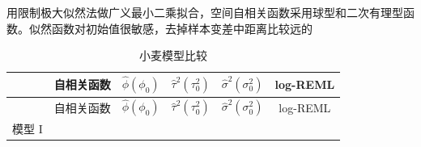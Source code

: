 \documentclass[12pt,a4paper,UTF8,twoside]{book}
\theoremstyle{definition}
\theoremstyle{definition}
\theoremstyle{definition}
\theoremstyle{remark}
\begin{document}
用限制极大似然法做广义最小二乘拟合，空间自相关函数采用球型和二次有理型函数。似然函数对初始值很敏感，去掉样本变差中距离比较远的

\begin{longtable}[]{@{}lrrrrc@{}}
\caption{\label{tab:yields-model-compare} 小麦模型比较}\tabularnewline
\toprule
\begin{minipage}[b]{0.08\columnwidth}\raggedright
\strut
\end{minipage} & \begin{minipage}[b]{0.08\columnwidth}\raggedleft
自相关函数\strut
\end{minipage} & \begin{minipage}[b]{0.18\columnwidth}\raggedleft
\(\hat{\phi}(\phi_0)\)\strut
\end{minipage} & \begin{minipage}[b]{0.20\columnwidth}\raggedleft
\(\hat{\tau}^2(\tau^2_{0})\)\strut
\end{minipage} & \begin{minipage}[b]{0.19\columnwidth}\raggedleft
\(\hat{\sigma}^2(\sigma^2_{0})\)\strut
\end{minipage} & \begin{minipage}[b]{0.09\columnwidth}\centering
log-REML\strut
\end{minipage}\tabularnewline
\midrule
\endfirsthead
\toprule
\begin{minipage}[b]{0.08\columnwidth}\raggedright
\strut
\end{minipage} & \begin{minipage}[b]{0.08\columnwidth}\raggedleft
自相关函数\strut
\end{minipage} & \begin{minipage}[b]{0.18\columnwidth}\raggedleft
\(\hat{\phi}(\phi_0)\)\strut
\end{minipage} & \begin{minipage}[b]{0.20\columnwidth}\raggedleft
\(\hat{\tau}^2(\tau^2_{0})\)\strut
\end{minipage} & \begin{minipage}[b]{0.19\columnwidth}\raggedleft
\(\hat{\sigma}^2(\sigma^2_{0})\)\strut
\end{minipage} & \begin{minipage}[b]{0.09\columnwidth}\centering
log-REML\strut
\end{minipage}\tabularnewline
\midrule
\endhead
\begin{minipage}[t]{0.08\columnwidth}\raggedright
模型 I\strut
\end{minipage} & \begin{minipage}[t]{0.08\columnwidth}\raggedleft

\end{minipage}
\end{longtable}
\end{document}
